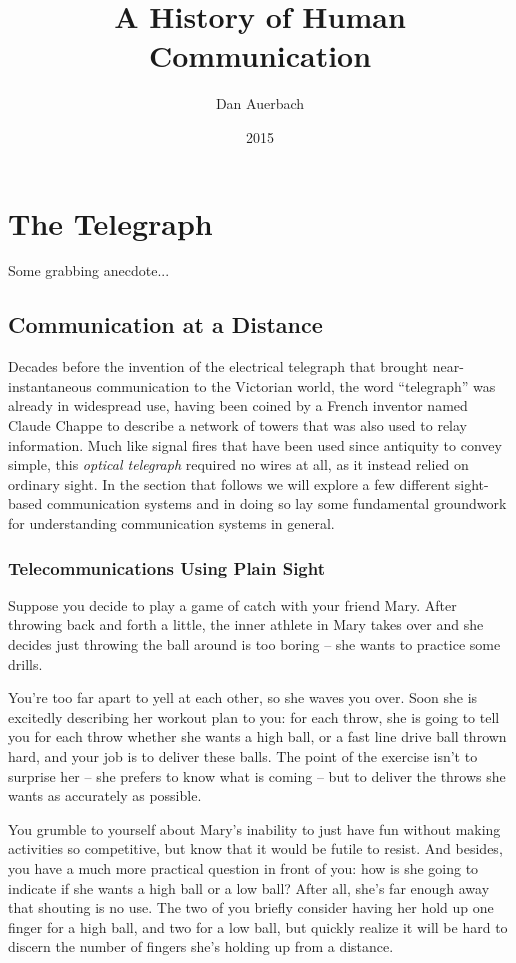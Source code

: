 \documentclass{book}
\begin{document}
\title{A History of Human Communication}
\author{Dan Auerbach}
\date{2015}
\maketitle

\part{The Telegraph}

Some grabbing anecdote...

\chapter{Communication at a Distance}

Decades before the invention of the electrical telegraph that brought near-instantaneous communication to the Victorian world, the word ``telegraph'' was already in widespread use, having been coined by a French inventor named Claude Chappe to describe a network of towers that was also used to relay information. Much like signal fires that have been used since antiquity to convey simple, this \emph{optical telegraph} required no wires at all, as it instead relied on ordinary sight. In the section that follows we will explore a few different sight-based communication systems and in doing so lay some fundamental groundwork for understanding communication systems in general.

\section{Telecommunications Using Plain Sight}

Suppose you decide to play a game of catch with your friend Mary. After throwing back and forth a little, the inner athlete in Mary takes over and she decides just throwing the ball around is too boring -- she wants to practice some drills.

You're too far apart to yell at each other, so she waves you over. Soon she is excitedly describing her workout plan to you: for each throw, she is going to tell you for each throw whether she wants a high ball, or a fast line drive ball thrown hard, and your job is to deliver these balls. The point of the exercise isn't to surprise her -- she prefers to know what is coming -- but to deliver the throws she wants as accurately as possible.

You grumble to yourself about Mary's inability to just have fun without making activities so competitive, but know that it would be futile to resist. And besides, you have a much more practical question in front of you: how is she going to indicate if she wants a high ball or a low ball? After all, she's far enough away that shouting is no use. The two of you briefly consider having her hold up one finger for a high ball, and two for a low ball, but quickly realize it will be hard to discern the number of fingers she's holding up from a distance.
\end{document}
